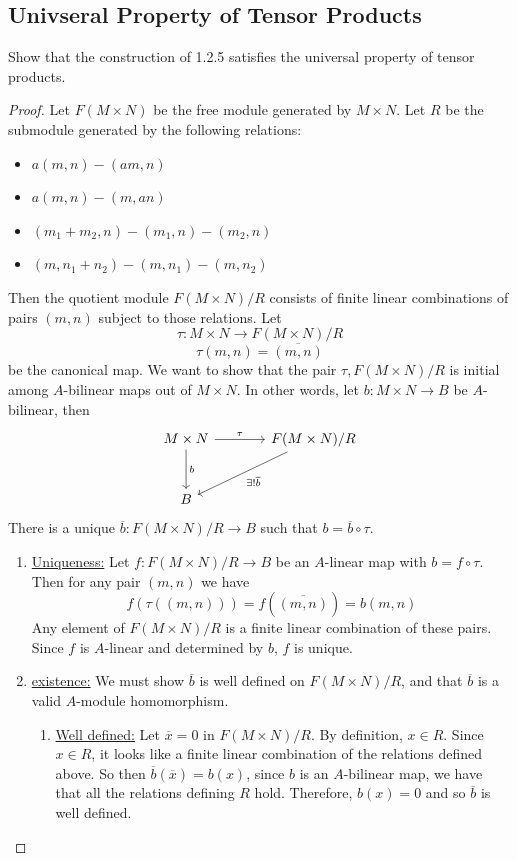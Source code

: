 \documentclass[hidelinks,12pt]{article}
\newcommand{\ul}{\underline}
\begin{document}
\subsection{Univseral Property of Tensor Products}
Show that the construction of 1.2.5 satisfies the universal property of tensor products.
\begin{proof}
Let \(F(M\times N)\) be the free module generated by \(M\times N\). Let \(R\) be the submodule generated by the following relations: \begin{itemize}
    \item \(a(m,n)-(am,n)\)
    \item \(a(m,n)-(m,an)\)
    \item \((m_{1}+m_{2},n)-(m_{1},n)-(m_{2},n)\)
    \item \((m,n_{1}+n_{2})-(m,n_{1})-(m,n_{2})\)
\end{itemize}
Then the quotient module \(F(M\times N)/R\) consists of finite linear combinations of pairs \((m,n)\) subject to those relations.
Let
\[
    \tau:M\times N\to F(M\times N)/R
\]
\[
    \tau(m,n)=\overline{(m,n)}
\]
be the canonical map. We want to show that the pair \(\tau,F(M\times N)/R\) is initial among \(A\)-bilinear maps out of \(M\times N\). In other words, let \(b:M\times N\to B\) be \(A\)-bilinear, then \[
\begin{tikzcd}[row sep=large,column sep=large]
    M\times N \arrow[r, "\tau"] \arrow[d, "b"] & F(M\times N)/R \arrow[dl, "\exists !\overline{b}"] \\
B &
\end{tikzcd}
\]
There is a unique \(\overline{b}:F(M\times N)/R\to B\) such that \(b=\overline{b}\circ\tau\).
\begin{enumerate}[label=(\roman*).]
    \item \ul{Uniqueness:} Let \(f:F(M\times N)/R\to B\) be an \(A\)-linear map with \(b=f\circ\tau\). Then for any pair \((m,n)\) we have \[
            f(\tau((m,n)))=f(\overline{(m,n)})=b(m,n)
    \]
    Any element of \(F(M\times N)/R\) is a finite linear combination of these pairs. Since \(f\) is \(A\)-linear and determined by \(b\), \(f\) is unique.
\item \ul{existence:} We must show \(\overline{b}\) is well defined on \(F(M\times N)/R\), and that \(\overline{b}\) is a valid \(A\)-module homomorphism.
    \begin{enumerate}[label=(\alph*).]
        \item \ul{Well defined:} Let \(\overline{x}=0\) in \(F(M\times N)/R\). By definition, \(x\in R\). Since \(x\in R\), it looks like a finite linear combination of the relations defined above. So then \(\overline{b}(\overline{x})=b(x)\), since \(b\) is an \(A\)-bilinear map, we have that all the relations defining \(R\) hold. Therefore, \(b(x)=0\) and so \(\overline{b}\) is well defined.

\end{enumerate}
\end{enumerate}
\end{proof}
\end{document}
